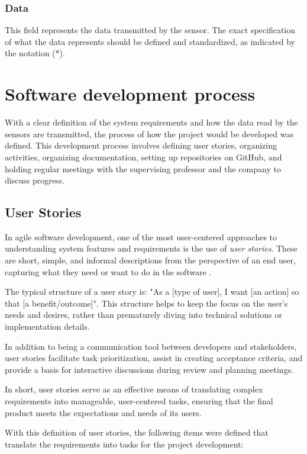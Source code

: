 \subsubsection{Data}

This field represents the data transmitted by the sensor. The exact specification of what the data represents should be defined and standardized, as indicated by the notation (*).


\section[Software development process]{Software development process}
With a clear definition of the system requirements and how the data read by the sensors are transmitted, the process of how the project would be developed was defined. This development process involves defining user stories, organizing activities, organizing documentation, setting up repositories on GitHub, and holding regular meetings with the supervising professor and the company to discuss progress.

\subsection{User Stories}
In agile software development, one of the most user-centered approaches to understanding system features and requirements is the use of \textit{user stories}. These are short, simple, and informal descriptions from the perspective of an end user, capturing what they need or want to do in the software \cite{lucassen2015forging}.

The typical structure of a user story is: "As a [type of user], I want [an action] so that [a benefit/outcome]". This structure helps to keep the focus on the user's needs and desires, rather than prematurely diving into technical solutions or implementation details.

In addition to being a communication tool between developers and stakeholders, user stories facilitate task prioritization, assist in creating acceptance criteria, and provide a basis for interactive discussions during review and planning meetings.

In short, user stories serve as an effective means of translating complex requirements into manageable, user-centered tasks, ensuring that the final product meets the expectations and needs of its users.

With this definition of user stories, the following items were defined that translate the requirements into tasks for the project development:

